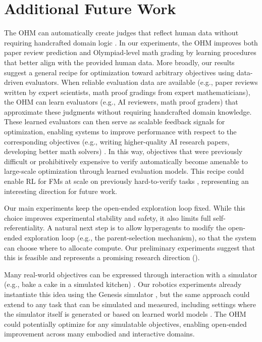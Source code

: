 \documentclass[]{fairmeta}
\begin{document}
\section{Additional Future Work}
\label{app:future-work}

The OHM can automatically create judges that reflect human data without requiring handcrafted domain logic \citep{zheng2023judging, alazraki2025reverse}. In our experiments, the OHM improves both paper review prediction and Olympiad-level math grading by learning procedures that better align with the provided human data. More broadly, our results suggest a general recipe for optimization toward arbitrary objectives using data-driven evaluators. When reliable evaluation data are available (e.g., paper reviews written by expert scientists, math proof gradings from expert mathematicians), the OHM can learn evaluators (e.g., AI reviewers, math proof graders) that approximate these judgments without requiring handcrafted domain knowledge. These learned evaluators can then serve as scalable feedback signals for optimization, enabling systems to improve performance with respect to the corresponding objectives (e.g., writing higher-quality AI research papers, developing better math solvers) \citep{zeng2025rlve, chen2025multi, feng2026semi}. In this way, objectives that were previously difficult or prohibitively expensive to verify automatically become amenable to large-scale optimization through learned evaluation models. This recipe could enable RL for FMs at scale on previously hard-to-verify tasks \citep{ouyang2022training, shao2024deepseekmath, tan2026self}, representing an interesting direction for future work.

Our main experiments keep the open-ended exploration loop fixed. While this choice improves experimental stability and safety, it also limits full self-referentiality. A natural next step is to allow hyperagents to modify the open-ended exploration loop (e.g., the parent-selection mechanism), so that the system can choose where to allocate compute. Our preliminary experiments suggest that this is feasible and represents a promising research direction ().

Many real-world objectives can be expressed through interaction with a simulator (e.g., bake a cake in a simulated kitchen) \citep{wang2023robogen}. Our robotics experiments already instantiate this idea using the Genesis simulator \citep{genesis2024}, but the same approach could extend to any task that can be simulated and measured, including settings where the simulator itself is generated \citep{sudhakaran2023mariogpt, yin2026vision} or based on learned world models \citep{bruce2024genie, guzel2025imagined, ball2025genie}. The OHM could potentially optimize for any simulatable objectives, enabling open-ended improvement across many embodied and interactive domains.
\end{document}
